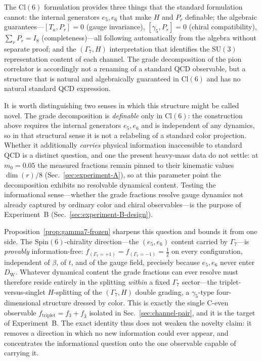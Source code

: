\documentclass[12pt]{article}
\theoremstyle{definition}
\theoremstyle{remark}
\newcommand{\cl}{\mathrm{Cl}}           %
\newcommand{\spin}{\mathrm{Spin}}       %
\newcommand{\su}{\mathrm{SU}}           %
\newcommand{\dW}{D_{\mathrm{W}}}        %
\newcommand{\half}{\tfrac{1}{2}}
\newcommand{\GaSeven}{\Gamma_7}                      %
\newcommand{\ftriplet}{f_{\mathrm{triplet}}}          %
\begin{document}
	The $\cl(6)$ formulation provides three things that the standard formulation
	cannot: the internal generators $e_5, e_6$ that make $H$ and $P_r$ definable;
	the algebraic guarantees---$[T_a, P_r]=0$ (gauge invariance),
	$[\gamma_5, P_r]=0$ (chiral compatibility), $\sum_r P_r = I_8$
	(completeness)---all following automatically from the algebra without separate
	proof; and the $(\GaSeven, H)$ interpretation that identifies the $\su(3)$
	representation content of each channel.  The grade decomposition of the pion
	correlator is accordingly not a renaming of a standard QCD observable, but a
	structure that is natural and algebraically guaranteed in $\cl(6)$ and has no
	natural standard QCD expression.
	
	It is worth distinguishing two senses in which this structure might be called
	novel.  The grade decomposition is \emph{definable} only in $\cl(6)$: the
	construction above requires the internal generators $e_5,e_6$ and is independent
	of any dynamics, so in that structural sense it is not a relabeling of a standard
	color projection.  Whether it additionally \emph{carries} physical information
	inaccessible to standard QCD is a distinct question, and one the present
	heavy-mass data do not settle: at $m_0=0.05$ the measured fractions remain
	pinned to their kinematic values $\dim(r)/8$ (Sec.~\ref{sec:experiment-A}), so
	at this parameter point the decomposition exhibits no resolvable dynamical
	content.  Testing the informational sense---whether the grade fractions resolve
	gauge dynamics not already captured by ordinary color and chiral
	observables---is the purpose of Experiment~B
	(Sec.~\ref{sec:experiment-B-design}).
	
	Proposition~\ref{prop:gamma7-frozen} sharpens this question and bounds it
	from one side.  The $\spin(6)$-chirality direction---the $(e_5,e_6)$ content
	carried by $\GaSeven$---is \emph{provably} information-free:
	$f_{(\GaSeven=+1)} = f_{(\GaSeven=-1)} = \half$ on every configuration,
	independent of $\beta$, of $t$, and of the gauge field, precisely because
	$e_5,e_6$ never enter $\dW$.  Whatever dynamical content the grade fractions
	can ever resolve must therefore reside entirely in the splitting \emph{within}
	a fixed $\GaSeven$ sector---the triplet-versus-singlet $H$-splitting of the
	$(\GaSeven,H)$ double grading, a $\gamma_5$-type four-dimensional structure
	dressed by color.  This is exactly the single C-even observable
	$\ftriplet = f_3 + f_{\bar 3}$ isolated in Sec.~\ref{sec:channel-pair}, and it
	is the target of Experiment~B.  The exact identity thus does not weaken the
	novelty claim: it removes a direction in which no new information could ever
	appear, and concentrates the informational question onto the one observable
	capable of carrying it.
	
\end{document}
